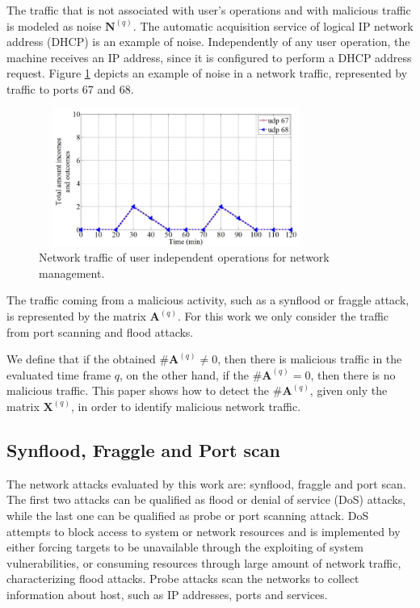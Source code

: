 \documentclass[review]{elsarticle}
\begin{document}
The traffic that is not associated with user's operations and with malicious traffic is modeled as noise $\boldsymbol{N}^{(q)}$. The automatic acquisition service of logical IP network address (DHCP) is an example of noise. Independently of any user operation, the machine receives an IP address, since it is configured to perform a DHCP address request. Figure \ref{fig:fig4} depicts an example of noise in a network traffic, represented by traffic to ports 67 and 68.

\begin{figure}[h!]
     \centering 
     \includegraphics[height=4.5cm, width=9cm]{results/figures/fig04.png}
     \caption{Network traffic of user independent operations for network management.}
     \label{fig:fig4}
\end{figure}

The traffic coming from a malicious activity, such as a synflood or fraggle attack, is represented by the matrix $\boldsymbol{A}^{(q)}$. For this work we only consider the traffic from port scanning and flood attacks.

We define that if the obtained $\#\boldsymbol{A}^{(q)} ≠ 0$, then there is malicious traffic in the evaluated time frame $q$, on the other hand, if the $\#\boldsymbol{A}^{(q)} = 0$, then there is no malicious traffic. This paper shows how to detect the $\#\boldsymbol{A}^{(q)}$, given only the matrix $\boldsymbol{X}^{(q)}$, in order to identify malicious network traffic.

\subsection{Synflood, Fraggle and Port scan}
\label{sec:SynfloodFraggleandPortscan}

The network attacks evaluated by this work are: synflood, fraggle and port scan. The first two attacks can be qualified as flood or denial of service (DoS) attacks, while the last one can be qualified as probe or port scanning attack. DoS attempts to block access to system or network resources and is implemented by either forcing targets to be unavailable through the exploiting of system vulnerabilities, or consuming resources through large amount of network traffic, characterizing flood attacks. Probe attacks scan the networks to collect information about host, such as IP addresses, ports and services.
\end{document}
